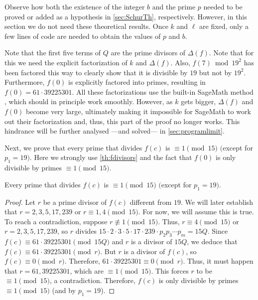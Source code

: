 \documentclass[../main.tex]{subfiles}
\begin{document}
 Observe how both the existence of the integer $b$ and the prime $p$ needed to be proved or added as a hypothesis in \cref{sec:SchurTh}, respectively. However, in this section we do not need these theoretical results. Once $k$ and $\ell$ are fixed, only a few lines of code are needed to obtain the values of $p$ and $b$.
  
 Note that the first five terms of $Q$ are the prime divisors of $\Delta(f)$. Note that for this we need the explicit factorization of $k$ and $\Delta(f)$. Also, $f(7) \bmod{19^2}$ has been factored this way to clearly show that it is divisible by $19$ but not by $19^2$. Furthermore, $f(0)$ is explicitly factored into primes, resulting in $f(0)=61\cdot39225301$. All these factorizations use the built-in SageMath method \textcolor{blue}{}, which should in principle work smoothly. However, as $k$ gets bigger, $\Delta(f)$ and $f(0)$ become very large, ultimately making it impossible for SageMath to work out their factorization and, thus, this part of the proof no longer works. This hindrance will be further analysed ---and solved--- in \cref{sec:programlimit}. 
 
  Next, we prove that every prime that divides $f(c)$ is $\equiv 1\pmod{15}$ $($except for $p_{1}=19)$. Here we strongly use \cref{th:fdivisors} and the fact that $f(0)$ is only divisible by primes $\equiv 1 \pmod{15}$.\\
 
  \begin{mdframed}\small
  	\begin{lemmanonumber}
  		Every prime that divides $f(c)$ is $\equiv 1\pmod{15}$ $($except for $p_{1}=19)$. 
  	\end{lemmanonumber}
  	\begin{proof}
  		Let $r$ be a prime divisor of $f(c)$ different from $19$. We will later establish that $r=2, 3, 5, 17, 239$ or $r\equiv 1,4\pmod{15}$. For now, we will assume this is true. To reach a contradiction, suppose $r\not\equiv 1\pmod{15}$. Thus, $r\equiv 4\pmod{15}$ or $r=2, 3, 5, 17, 239$, so $r$ divides $15\cdot{2 \cdot 3 \cdot 5 \cdot 17 \cdot 239}\cdot p_{2}p_{3}\cdots p_m=15Q$. Since $f(c)\equiv 61 \cdot 39225301\pmod{15Q}$ and $r$ is a divisor of $15Q$, we deduce that $f(c)\equiv 61 \cdot 39225301\pmod{r}$. But $r$ is a divisor of $f(c)$, so $f(c)\equiv 0 \pmod{r}$. Therefore, $61 \cdot 39225301\equiv 0\pmod{r}$. Thus, it must happen that $r=61, 39225301$, which are $\equiv 1 \pmod{15}$. This forces $r$ to be $\equiv 1 \pmod{15}$, a contradiction. Therefore, $f(c)$ is only divisible by primes $\equiv 1\pmod{15}$ (and by $p_{1}=19$).
  	\end{proof}
  \end{mdframed}
  
\end{document}

